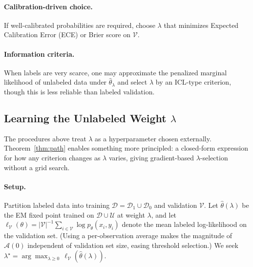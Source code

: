 \documentclass[11pt]{article}
\theoremstyle{definition}
\newcommand{\calD}{\mathcal{D}}
\newcommand{\calU}{\mathcal{U}}
\newcommand{\lam}{\lambda}
\newcommand{\calV}{\mathcal{V}}
\newcommand{\calA}{\mathcal{A}}
\begin{document}
\paragraph{Calibration-driven choice.}
If well-calibrated probabilities are required, choose \(\lam\) that
minimizes Expected Calibration Error (ECE) or Brier score on \(\mathcal{V}\).

\paragraph{Information criteria.}
When labels are very scarce, one may approximate the penalized marginal
likelihood of unlabeled data under \(\hat\theta_\lam\) and select
\(\lam\) by an ICL-type criterion, though this is less reliable than
labeled validation.

\subsection{Learning the Unlabeled Weight \texorpdfstring{$\lambda$}{lambda}}
\label{sec:learn-lam}

The procedures above treat \(\lam\) as a hyperparameter chosen externally.
Theorem~\ref{thm:path} enables something more principled: a closed-form
expression for how any criterion changes as \(\lam\) varies, giving
gradient-based \(\lam\)-selection without a grid search.

\paragraph{Setup.}
Partition labeled data into training \(\calD=\calD_1\cup\calD_0\) and
validation \(\calV\).
Let \(\hat\theta(\lam)\) be the EM fixed point trained on \(\calD\cup\calU\)
at weight \(\lam\), and let \(\ell_{\calV}(\theta) = |\calV|^{-1}\sum_{i\in\calV}\log p_\theta(x_i,y_i)\)
denote the mean labeled log-likelihood on the validation set.
(Using a per-observation average makes the magnitude of \(\calA(0)\)
independent of validation set size, easing threshold selection.)
We seek \(\lam^\star = \arg\max_{\lam\geq 0}\,\ell_{\calV}(\hat\theta(\lam))\).
\end{document}
